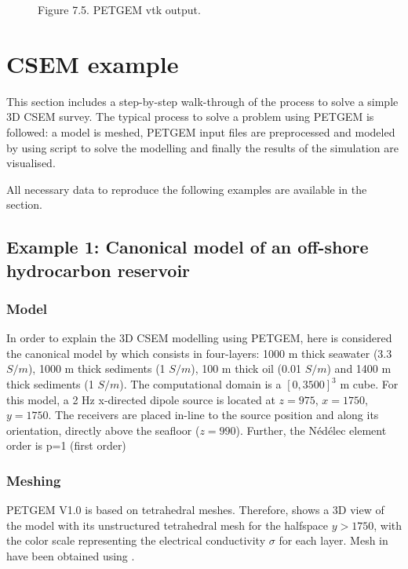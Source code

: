 \documentclass[letterpaper,10pt,english]{sphinxmanual}
\begin{document}
\begin{figure}[htbp]
\centering
\capstart

\noindent{}
\caption{Figure 7.5. PETGEM vtk output.}\label{\detokenize{Manual:id20}}\label{\detokenize{Manual:figure-7-5}}\end{figure}


\section{CSEM example}
\label{\detokenize{Manual:csem-example}}\label{\detokenize{Manual:examples}}
This section includes a step-by-step walk-through of the process to solve a
simple 3D CSEM survey. The typical process to solve a problem using
PETGEM is followed: a model is meshed, PETGEM input files are preprocessed and modeled by
using  script to solve
the modelling and finally the results of the simulation are visualised.

All necessary data to reproduce the following examples are available in the
{\hyperref[\detokenize{Download:download}]{}} section.


\subsection{Example 1: Canonical model of an off-shore hydrocarbon reservoir}
\label{\detokenize{Manual:example-1-canonical-model-of-an-off-shore-hydrocarbon-reservoir}}

\subsubsection{Model}
\label{\detokenize{Manual:model}}
In order to explain the 3D CSEM modelling using PETGEM, here is considered the
canonical model by
 which
consists in four-layers: 1000 m thick seawater (3.3 \(S/m\)), 1000 m thick sediments
(1 \(S/m\)), 100 m thick oil (0.01 \(S/m\)) and 1400 m thick sediments
(1 \(S/m\)). The computational domain is a \([0,3500]^3\) m cube. For this model,
a 2 Hz x-directed dipole source is located at \(z=975\), \(x=1750\),
\(y=1750\). The receivers are placed in-line to the source position and along its
orientation, directly above the seafloor (\(z = 990\)). Further, the
Nédélec element order is p=1 (first order)


\subsubsection{Meshing}
\label{\detokenize{Manual:meshing}}
PETGEM V1.0 is based on tetrahedral meshes. Therefore,  {\hyperref[\detokenize{Manual:figure-7-8}]{}}
shows a 3D view of the model with its unstructured tetrahedral mesh for
the halfspace \(y>1750\), with the color scale representing the electrical
conductivity \(\sigma\) for each layer. Mesh in {\hyperref[\detokenize{Manual:figure-7-8}]{}} have been
obtained using .
\end{document}

